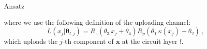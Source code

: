 \documentclass[20pt, final]{beamer}
\newlength{\colwidth}
\begin{document}
\begin{frame}[t]
\begin{columns}[t]
\begin{column}{\colwidth}
\begin{alertblock}{Ansatz}
\begin{figure} 
\label{fig:qpdf}
\end{figure}

where we use the following definition of the uploading channel:
\begin{equation}
L(x_j| \bm{\theta}_{l,j}) = R_z(\theta_3\,x_j + \theta_4) R_y(\theta_1\, \kappa(x_j) + \theta_2) \ ,
\label{eq:uploading_layer}
\end{equation}
which uploads the $j$-th component of $\bm{x}$ at the circuit layer $l$.
\end{alertblock}


\end{column}
\end{columns}
\end{frame}
\end{document}
